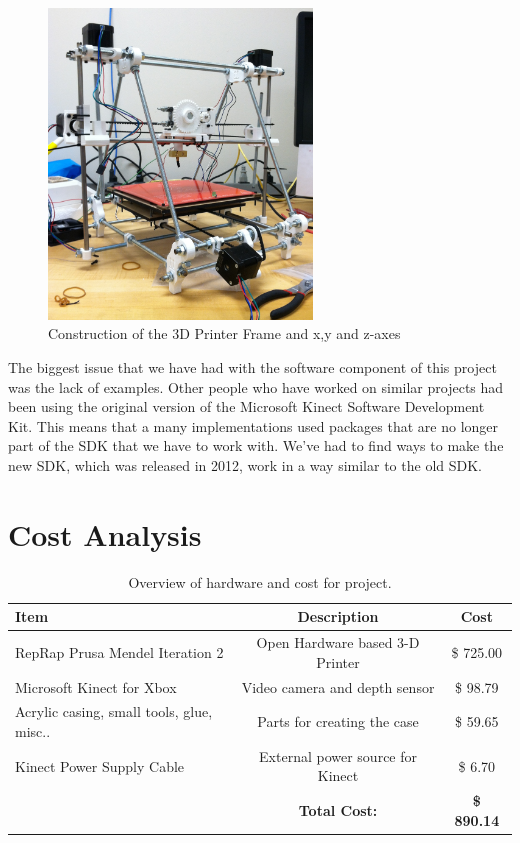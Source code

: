 \documentclass[pdftex,10.5pt]{report}
\begin{document}
\begin{figure}[H]
	\centering
	\includegraphics[width=70mm]{figures/photo.JPG}
	\caption{Construction of the 3D Printer Frame and x,y and z-axes}
	\label{basebuilt}
\end{figure}

The biggest issue that we have had with the software component of this project was the lack of examples. Other people who have worked on similar projects had been using the original version of the Microsoft Kinect Software Development Kit. This means that a many implementations used packages that are no longer part of the SDK that we have to work with. We've had to find ways to make the new SDK, which was released in 2012, work in a way similar to the old SDK. 

\section{Cost Analysis}

\begin{table}[h]
	\centering
 	\begin{tabular}{|l|c|c|}
		\hline
		\textbf{Item} & \textbf{Description} & \textbf{Cost} \\
		\hline
 		RepRap Prusa Mendel Iteration 2 & Open Hardware based 3-D Printer& \$ 725.00\\
		Microsoft Kinect for Xbox & Video camera and depth sensor & \$ 98.79 \\
		Acrylic casing, small tools, glue, misc.. & Parts for creating the case & \$ 59.65 \\
		Kinect Power Supply Cable & External power source for Kinect & \$ 6.70 \\
		\hline
		& \textbf{Total Cost:} & \textbf{\$  890.14} \\
		\hline
	\end{tabular}
	\caption{
	Overview of hardware and cost for project.
	}	
\label{tab:costs}
\end{table}
\end{document}
